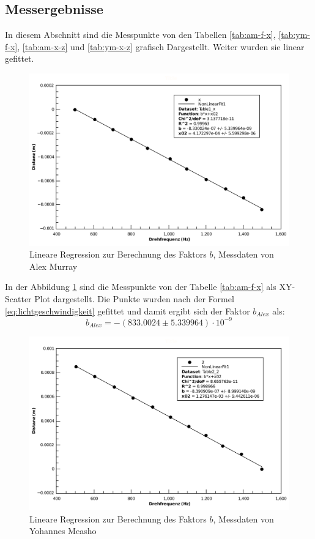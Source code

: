 \subsection{Messergebnisse}

In  diesem Abschnitt sind die  Messpunkte  von  den  Tabellen  \ref{tab:am-f-x},
\ref{tab:ym-f-x},  \ref{tab:am-x-z}  und \ref{tab:ym-x-z} grafisch  Dargestellt.
Weiter wurden sie linear gefittet.

\begin{figure}[H]
    \center
    \includegraphics[width=.8\textwidth]{images/am-f-x-fit-b.pdf}
    \caption{Lineare Regression zur Berechnung des Faktors $b$, Messdaten von Alex Murray}
    \label{fig:am-f-x-fit-b}
\end{figure}

In  der Abbildung \ref{fig:am-f-x-fit-b} sind die  Messpunkte  von  der  Tabelle
\ref{tab:am-f-x} als  XY-Scatter  Plot  dargestellt.  Die Punkte wurden nach der
Formel \ref{eq:lichtgeschwindigkeit} gefittet und damit ergibt  sich  der Faktor
$b_{Alex}$ als:
\begin{equation}
    b_{Alex} = -(833.0024 \pm 5.339964)\cdot 10^{-9}
    \label{eq:am-b}
\end{equation}

\begin{figure}[H]
    \center
    \includegraphics[width=.8\textwidth]{images/ym-f-x-fit-b.pdf}
    \caption{Lineare Regression zur Berechnung des Faktors $b$, Messdaten von Yohannes Measho}
    \label{fig:ym-f-x-fit-b}
\end{figure}

